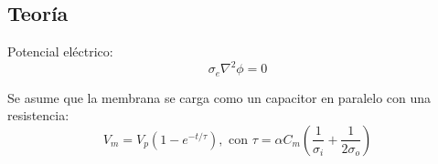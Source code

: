 \documentclass[a0,portrait]{a0poster}
\begin{document}
\begin{multicols}{2}
%
%

\color{DarkSlateGray} %

\section*{Teoría}

Potencial eléctrico:
			\begin{equation}
				\sigma_{e} \nabla^2 \phi = 0
			\end{equation}

			

			Se asume que la membrana se carga como un capacitor en paralelo con una resistencia:
			\begin{equation}
				V_m = V_p (1 - e^{-t/\tau}),
				\textrm{ con } \tau = \alpha C_m \left( \frac{1}{\sigma_i} + \frac{1}{2 \sigma_o} \right)
			\end{equation}\\
			

\end{multicols}
\end{document}
